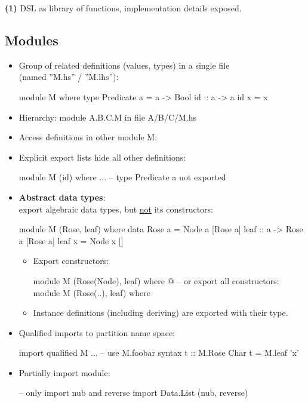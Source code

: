 \textbf{(1)}
DSL as library of functions, implementation details exposed. 



\subsection{Modules}

\begin{itemize}
    \item Group of related definitions (values, types) in a single file \\ (named ''M.hs'' / ''M.lhs''):\\
    \begin{Haskell}
module M where
    type Predicate a = a -> Bool
    id :: a -> a
    id x = x
    \end{Haskell}
    \item Hierarchy: module A.B.C.M in file A/B/C/M.hs
    \item Access definitions in other module M: 

    \newpage
    \item Explicit export lists hide all other definitions:\\
    \begin{Haskell}
module M (id) where
    ...
    -- type Predicate a not exported
    \end{Haskell}
    \item \textbf{Abstract data types}:\\
    export algebraic data types, but \underline{not} its constructors:\\
        \begin{Haskell}
module M (Rose, leaf) where
    data Rose a = Node a [Rose a]
    leaf :: a -> Rose a [Rose a]
    leaf x = Node x []
\end{Haskell}
        
    \begin{itemize}
        \item Export constructors:\\
        \begin{Haskell}
module M (Rose(Node), leaf) where
    @\dots@
-- or export all constructors:
module M (Rose(..), leaf) where
        \end{Haskell}
        \item Instance definitions (including deriving) are exported with their type.
    \end{itemize}
    \item Qualified imports to partition name space:\\
    \begin{Haskell}
import qualified M
    ...
    -- use M.foobar syntax
    t :: M.Rose Char
    t = M.leaf 'x'
    \end{Haskell}
    \item Partially import module:\\
    \begin{Haskell}
-- only import nub and reverse
import Data.List (nub, reverse)


\end{Haskell}
\end{itemize}
